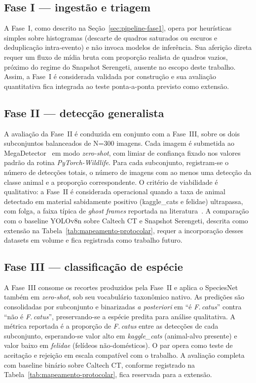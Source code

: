\subsection*{Fase I --- ingestão e triagem}

A Fase~I, como descrito na Seção~\ref{sec:pipeline-fase1}, opera por heurísticas simples sobre histogramas (descarte de quadros saturados ou escuros e deduplicação intra-evento) e não invoca modelos de inferência. Sua aferição direta requer um fluxo de mídia bruta com proporção realista de quadros vazios, próximo do regime do Snapshot Serengeti, ausente no escopo deste trabalho. Assim, a Fase~I é considerada validada por construção e sua avaliação quantitativa fica integrada ao teste ponta-a-ponta previsto como extensão.

\subsection*{Fase II --- detecção generalista}

A avaliação da Fase~II é conduzida em conjunto com a Fase~III, sobre os dois subconjuntos balanceados de N=300 imagens. Cada imagem é submetida ao MegaDetector~\cite{hernandez2024pytorchwildlife} em modo \textit{zero-shot}, com limiar de confiança fixado nos valores padrão da rotina \textit{PyTorch-Wildlife}. Para cada subconjunto, registram-se o número de detecções totais, o número de imagens com ao menos uma detecção da classe animal e a proporção correspondente. O critério de viabilidade é qualitativo: a Fase~II é considerada operacional quando a taxa de animal detectado em material sabidamente positivo (kaggle\_cats e felidae) ultrapassa, com folga, a faixa típica de \textit{ghost frames} reportada na literatura~\cite{velez2022choosing}. A comparação com o baseline YOLOv8n sobre Caltech CT e Snapshot Serengeti, descrita como extensão na Tabela~\ref{tab:mapeamento-protocolar}, requer a incorporação desses datasets em volume e fica registrada como trabalho futuro.

\subsection*{Fase III --- classificação de espécie}

A Fase~III consome os recortes produzidos pela Fase~II e aplica o SpeciesNet~\cite{google_speciesnet_blog} também em \textit{zero-shot}, sob seu vocabulário taxonômico nativo. As predições são consolidadas por subconjunto e binarizadas \textit{a posteriori} em ``é \textit{F.\,catus}'' contra ``não é \textit{F.\,catus}'', preservando-se a espécie predita para análise qualitativa. A métrica reportada é a proporção de \textit{F.\,catus} entre as detecções de cada subconjunto, esperando-se valor alto em \textit{kaggle\_cats} (animal-alvo presente) e valor baixo em \textit{felidae} (felídeos não-domésticos). O par opera como teste de aceitação e rejeição em escala compatível com o trabalho. A avaliação completa com baseline binário sobre Caltech CT, conforme registrado na Tabela~\ref{tab:mapeamento-protocolar}, fica reservada para a extensão.

